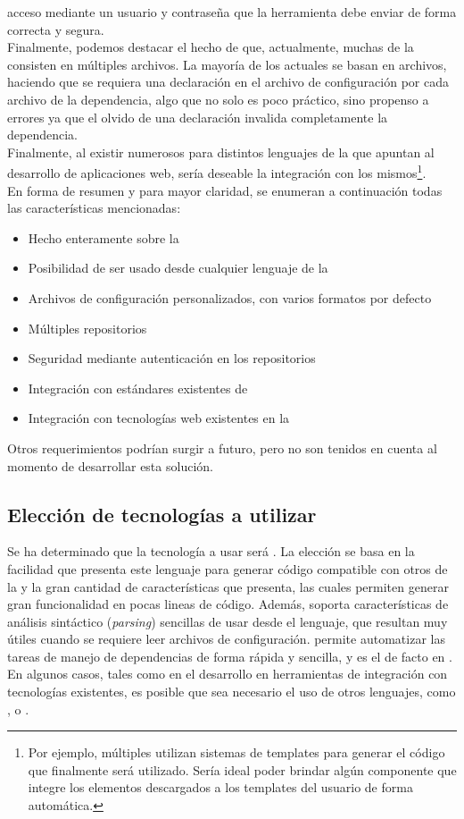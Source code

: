acceso mediante un usuario y contraseña que la herramienta debe enviar de forma
correcta y segura.\\
Finalmente, podemos destacar el hecho de que, actualmente, muchas \dependencies
de la \viewtier consisten en múltiples archivos. La mayoría de los \depmgrs actuales
se basan en archivos, haciendo que se requiera una declaración en el archivo de
configuración por cada archivo de la dependencia, algo que no solo es poco práctico,
sino propenso a errores ya que el olvido de una declaración invalida completamente
la dependencia.\\
Finalmente, al existir numerosos \frameworks para distintos lenguajes de la \jvm
que apuntan al desarrollo de aplicaciones web, sería deseable la integración con los
mismos\footnote{
	Por ejemplo, múltiples \frameworks utilizan sistemas de templates para generar el
	código \html que finalmente será utilizado. Sería ideal poder brindar algún
	componente que integre los elementos descargados a los templates del usuario
	de forma automática.
}.\\
En forma de resumen y para mayor claridad, se enumeran a continuación todas las
características mencionadas:
\begin{itemize}
	\item Hecho enteramente sobre la \jvm
	\item Posibilidad de ser usado desde cualquier lenguaje de la \jvm
	\item Archivos de configuración personalizados, con varios formatos por defecto
	\item Múltiples repositorios
	\item Seguridad mediante autenticación en los repositorios
	\item Integración con estándares existentes de \depmgrs
	\item Integración con tecnologías web existentes en la \jvm
\end{itemize}
Otros requerimientos podrían surgir a futuro, pero no son tenidos en cuenta al
momento de desarrollar esta solución.

\subsection{Elección de tecnologías a utilizar}

Se ha determinado que la tecnología a usar será \scala. La elección se basa en la
facilidad que presenta este lenguaje para generar código compatible con otros de la
\jvm y la gran cantidad de características que presenta, las cuales permiten generar
gran funcionalidad en pocas lineas de código. Además, \scala soporta características
de análisis sintáctico (\emph{parsing}) sencillas de usar desde el lenguaje, que
resultan muy útiles cuando se requiere leer archivos de configuración. \sbt permite
automatizar las tareas de manejo de dependencias de forma rápida y sencilla, y es el
\depmgr de facto en \scala.\\
En algunos casos, tales como en el desarrollo en herramientas de integración con
tecnologías existentes, es posible que sea necesario el uso de otros lenguajes,
como \java, \clojure o \groovy.


